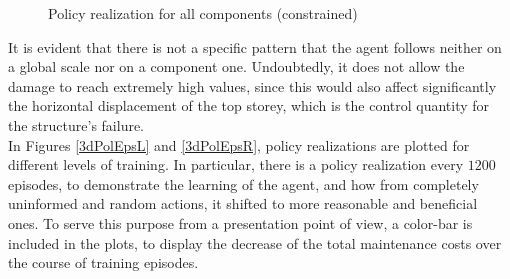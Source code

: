 \begin{figure}[H]
    \centering
	\caption{Policy realization for all components (constrained)}
	\label{2DframePolReal}
\end{figure}

\newpage

It is evident that there is not a specific pattern that the agent follows neither on a global scale nor on a component one. Undoubtedly, it does not allow the damage to reach extremely high values, since this would also affect significantly the horizontal displacement of the top storey, which is the control quantity for the structure's failure. \\

In Figures \ref{3dPolEpsL} and \ref{3dPolEpsR}, policy realizations are plotted for different levels of training. In particular, there is a policy realization every $1200$ episodes, to demonstrate the learning of the agent, and how from completely uninformed and random actions, it shifted to more reasonable and beneficial ones. To serve this purpose from a presentation point of view, a color-bar is included in the plots, to display the decrease of the total maintenance costs over the course of training episodes.

